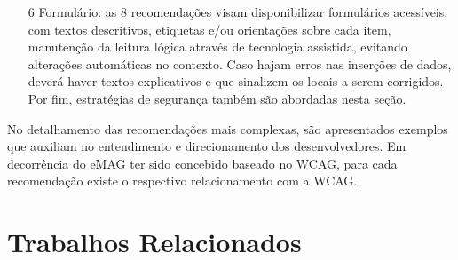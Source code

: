 \begin{itemize}
	\item[6] Formulário: as 8 recomendações visam disponibilizar formulários acessíveis, com textos descritivos, etiquetas e/ou orientações sobre cada item, manutenção da leitura lógica através de tecnologia assistida, evitando alterações automáticas no contexto. Caso hajam erros nas inserções de dados, deverá haver textos explicativos e que sinalizem os locais a serem corrigidos. Por fim, estratégias de segurança também são abordadas nesta seção.
	
\end{itemize}

No detalhamento das recomendações mais complexas, são apresentados exemplos que auxiliam no entendimento e direcionamento dos desenvolvedores. Em decorrência do eMAG ter sido concebido baseado no WCAG, para cada recomendação existe o respectivo relacionamento com a WCAG.


 


\section{Trabalhos Relacionados}

